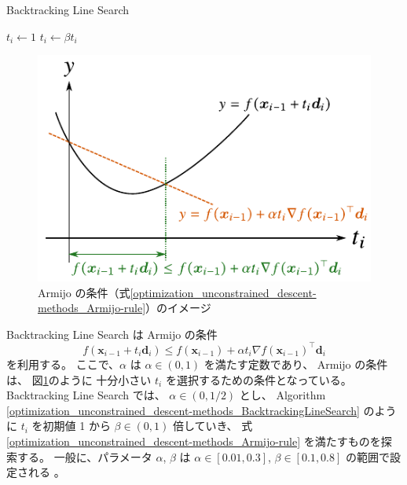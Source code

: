 \begin{algorithm}[tp]
    \caption{Backtracking Line Search \cite[Section 9.2]{Boyd2004}}
    \label{optimization_unconstrained_descent-methods_BacktrackingLineSearch}
    \begin{algorithmic}
            \State $t_i \gets 1$
                \State $t_i \gets \beta t_i$
            \EndWhile
        \EndProcedure
    \end{algorithmic}
\end{algorithm}

\begin{figure}[tp]
    \centering
    \includegraphics[width=0.7\linewidth]{optimization/Armijo-rule-image.pdf}
    \caption{Armijo の条件（式\eqref{optimization_unconstrained_descent-methods_Armijo-rule}）のイメージ}
    \label{optimization_unconstrained_descent-methods_Armijo-rule-image}
\end{figure}

Backtracking Line Search \cite[Section 9.2]{Boyd2004} は
Armijo の条件 \cite[Section 7.5]{Luenberger2003}
\begin{equation}
    f(\bm{x}_{i-1} + t_i \bm{d}_i) \le f(\bm{x}_{i-1}) + \alpha t_i \nabla f(\bm{x}_{i-1})^\top \bm{d}_i
    \label{optimization_unconstrained_descent-methods_Armijo-rule}
\end{equation}
を利用する。
ここで、$\alpha$ は $\alpha \in (0,1)$ を満たす定数であり、
Armijo の条件は、
図\ref{optimization_unconstrained_descent-methods_Armijo-rule-image}のように
十分小さい $t_i$ を選択するための条件となっている。
Backtracking Line Search では、
$\alpha \in (0, 1/2)$ とし、
Algorithm \ref{optimization_unconstrained_descent-methods_BacktrackingLineSearch}
のように
$t_i$ を初期値 1 から $\beta \in (0, 1)$ 倍していき、
式 \eqref{optimization_unconstrained_descent-methods_Armijo-rule} を満たすものを探索する。
一般に、パラメータ $\alpha$, $\beta$ は
$\alpha \in [0.01, 0.3]$, $\beta \in [0.1, 0.8]$ の範囲で設定される
\cite[Section 9.2]{Boyd2004}。
